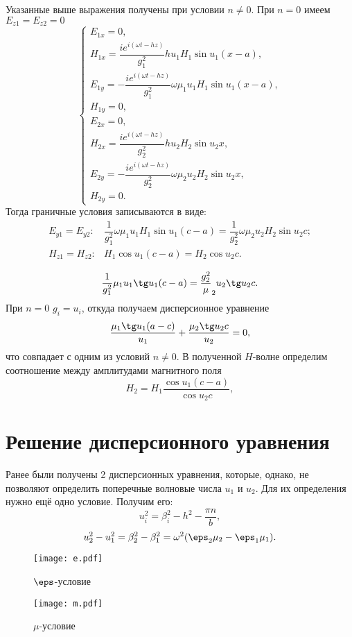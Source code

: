 \documentclass[a4paper]{hedsemwork}
\renewcommand{\frac}{\dfrac}
\begin{document}
Указанные выше выражения получены при условии \( n \neq 0 \). При \( n = 0 \)
имеем \( E_{z1} = E_{z2} = 0 \)
\[
    \left\{
    \begin{array}{l}
        E_{1x} = 0, \\
        H_{1x} = \frac{i e^{i(\omega t - h z)}}{g_1^2}
        h u_1 H_1 \sin u_1 (x-a),\\
        E_{1y} = -\frac{i e^{i(\omega t - h z)}}{g_1^2}
        \omega\mu_1u_1H_1 \sin u_1 (x-a),\\
        H_{1y} = 0,\\
        E_{2x} = 0,\\
        H_{2x} = \frac{i e^{i(\omega t - h z)}}{g_2^2}
        h u_2 H_2 \sin u_2 x,\\
        E_{2y} = -\frac{i e^{i(\omega t - h z)}}{g_2^2}
        \omega\mu_2u_2H_2 \sin u_2 x,\\
        H_{2y} = 0.
    \end{array}
    \right.
\]
Тогда граничные условия записываются в виде:
\[
\begin{array}{cl}
    E_{y1} = E_{y2}: &
    \frac{1}{g_1^2}  \omega\mu_1u_1H_1 \sin u_1 (c-a) =
    \frac{1}{g_2^2}  \omega\mu_2u_2H_2 \sin u_2 c ;\\
    H_{z1} = H_{z2}: & H_1\cos u_1 (c-a) = H_2\cos u_2 c.\\
\end{array}
\]
\[
    \frac{1}{g_1^2} \mu_1 u_1 \tg u_1 (c-a) = \frac{g_2^2} \mu_2 u_2 \tg u_2 c.
\]
При \( n=0 \) \( g_i = u_i \), откуда получаем дисперсионное уравнение
\[
    \frac{\mu_1\tg u_1 (a-c)}{u_1} + \frac{\mu_2\tg u_2 c}{u_2} = 0,
\]
что совпадает с одним из условий \( n \neq 0 \).
В полученной \( H \)-волне определим соотношение между амплитудами магнитного
поля
\[
    H_2 = H_1\frac{\cos u_1 (c-a)}{\cos u_2 c},
\]

\section{Решение дисперсионного уравнения}
Ранее были получены 2 дисперсионных уравнения, которые, однако, не позволяют
определить поперечные волновые числа \( u_1 \) и \( u_2 \). Для их определения
нужно ещё одно условие. Получим его:
\[
    u_i^2 = \beta_i^2 - h^2 - \frac{\pi n}{b},
\]
\[
    u_2^2 - u_1^2 = \beta_2^2 - \beta_1^2 = \omega^2(\eps_2\mu_2 - \eps_1\mu_1).
\]
\begin{figure}
    \texttt{[image: e.pdf]}
    \caption{\( \eps \)-условие}
\end{figure}
\begin{figure}
    \texttt{[image: m.pdf]}
    \caption{\( \mu \)-условие}
\end{figure}
\end{document}
